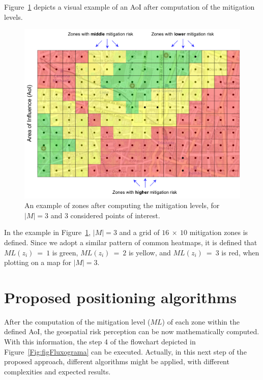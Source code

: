 \begin{refsection}
Figure~\ref{Fig:figGrid2} depicts a visual example of an AoI after computation of the mitigation levels. 


\begin{figure}[htbp!]
  \centering
  \includegraphics[width=0.77\linewidth]{Chapters/3-EDUs/images/MitigationZonesColors.pdf}
  \caption{An example of zones after computing the mitigation levels, for $|M|=3$ and 3 considered points of interest.}\label{Fig:figGrid2}
\end{figure}

In the example in Figure~\ref{Fig:figGrid2}, $|M|=3$ and a grid of $16~\times~10$ mitigation zones is defined. Since we adopt a similar pattern of common heatmaps, it is defined that $ML(z_i)~=~1$ is green, $ML(z_i)~=~2$ is yellow, and $ML(z_i)~=~3$ is red, when plotting on a map for $|M|=3$.


\section{Proposed positioning algorithms}\label{S:4}

After the computation of the mitigation level ($ML$) of each zone within the defined AoI, the geospatial risk perception can be now mathematically computed. With this information, the step 4 of the flowchart depicted in Figure~\ref{Fig:figFluxograma} can be executed. Actually, in this next step of the proposed approach, different algorithms might be applied, with different complexities and expected results. 


\end{refsection}
